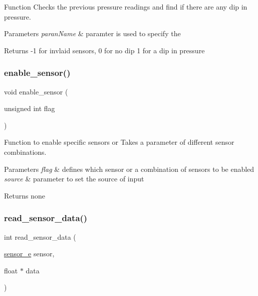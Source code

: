 Function Checks the previous pressure readings and find if there are any dip in pressure. 


\begin{DoxyParams}{Parameters}
{\em paran\+Name} & paramter is used to specify the\\
\hline
\end{DoxyParams}
\begin{DoxyReturn}{Returns}
-\/1 for invlaid sensors, 0 for no dip 1 for a dip in pressure 
\end{DoxyReturn}
\mbox{\label{group___base_sensors_module_ga882a0452720480e06504493292f2f0e2}} 
\subsubsection{\texorpdfstring{enable\+\_\+sensor()}{enable\_sensor()}}
{\footnotesize\ttfamily void enable\+\_\+sensor (\begin{DoxyParamCaption}\item[{unsigned int}]{flag }\end{DoxyParamCaption})}



Function to enable specific sensors or Takes a parameter of different sensor combinations. 


\begin{DoxyParams}{Parameters}
{\em flag} & defines which sensor or a combination of sensors to be enabled\\
\hline
{\em source} & parameter to set the source of input\\
\hline
\end{DoxyParams}
\begin{DoxyReturn}{Returns}
none 
\end{DoxyReturn}
\mbox{\label{group___base_sensors_module_gae8aa32a2ceb9ce2a8dc6d9df9ef8ffd2}} 
\subsubsection{\texorpdfstring{read\+\_\+sensor\+\_\+data()}{read\_sensor\_data()}}
{\footnotesize\ttfamily int read\+\_\+sensor\+\_\+data (\begin{DoxyParamCaption}\item[{\hyperlink{group___base_sensors_module_ga241bbfb8b20d2f411c4c10bb9703288c}{sensor\+\_\+e}}]{sensor,  }\item[{float $\ast$}]{data }\end{DoxyParamCaption})}



